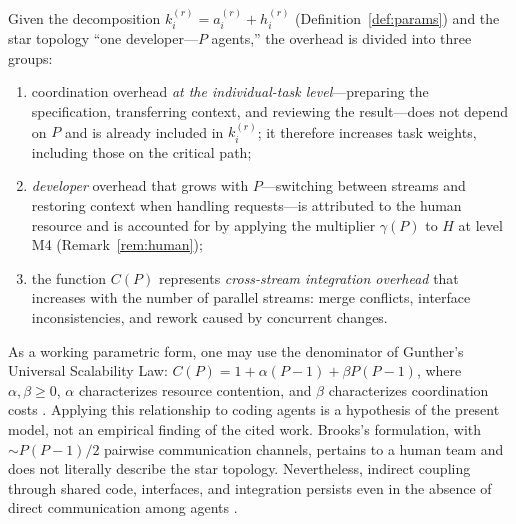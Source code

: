 \begin{remark}
Given the decomposition $k_i^{(r)} = a_i^{(r)} + h_i^{(r)}$ (Definition~\ref{def:params}) and the star topology ``one developer---$P$ agents,'' the overhead is divided into three groups:
\begin{enumerate}
  \item coordination overhead \emph{at the individual-task level}---preparing the specification, transferring context, and reviewing the result---does not depend on $P$ and is already included in $k_i^{(r)}$; it therefore increases task weights, including those on the critical path;
  \item \emph{developer} overhead that grows with $P$---switching between streams and restoring context when handling requests---is attributed to the human resource and is accounted for by applying the multiplier $\gamma(P)$ to $H$ at level M4 (Remark~\ref{rem:human});
  \item the function $C(P)$ represents \emph{cross-stream integration overhead} that increases with the number of parallel streams: merge conflicts, interface inconsistencies, and rework caused by concurrent changes.
\end{enumerate}
As a working parametric form, one may use the denominator of Gunther's Universal Scalability Law:
$C(P) = 1 + \alpha (P - 1) + \beta P (P - 1)$, where $\alpha,\beta\ge0$, $\alpha$ characterizes resource contention, and $\beta$ characterizes coordination costs \cite{gunther2008general}. Applying this relationship to coding agents is a hypothesis of the present model, not an empirical finding of the cited work. Brooks's formulation, with $\sim P(P-1)/2$ pairwise communication channels, pertains to a human team and does not literally describe the star topology. Nevertheless, indirect coupling through shared code, interfaces, and integration persists even in the absence of direct communication among agents \cite{brooks1995mythical}.
\end{remark}

